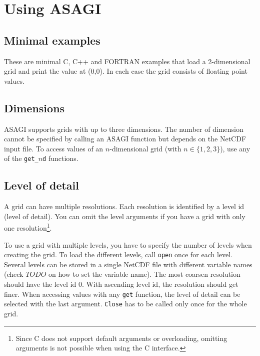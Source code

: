 \section{Using ASAGI}

\subsection{Minimal examples}

These are minimal C, C++ and FORTRAN examples that load a 2-dimensional grid and print the value at (0,0). In each case the grid consists of floating point values.







\subsection{Dimensions}

ASAGI supports grids with up to three dimensions. The number of dimension cannot be specified by calling an ASAGI function but depends on the NetCDF input file. To access values of an $n$-dimensional grid (with $n\in\{1,2,3\}$), use any of the \texttt{get\_$n$d} functions.

\subsection{Level of detail}

A grid can have multiple resolutions. Each resolution is identified by a level id (level of detail). You can omit the level arguments if you have a grid with only one resolution\footnote{Since C does not support default arguments or overloading, omitting arguments is not possible when using the C interface.}.

To use a grid with multiple levels, you have to specify the number of levels when creating the grid. To load the different levels, call \texttt{open} once for each level. Several levels can be stored in a single NetCDF file with different variable names (check $TODO$ on how to set the variable name). The most coarsen resolution should have the level id 0. With ascending level id, the resolution should get finer. When accessing values with any \texttt{get} function, the level of detail can be selected with the last argument. \texttt{Close} has to be called only once for the whole grid.

